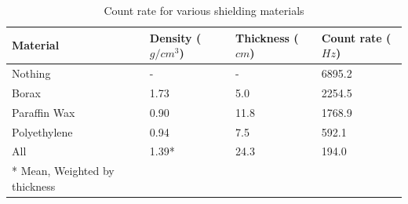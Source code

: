 \begin{table}[ht]
	\centering
	\begin{tabular}{ llll }
		Material 	& Density ($g/cm^3$)	& Thickness ($cm$) & Count rate ($Hz$)\\ \hline\hline
		Nothing  	& - 			& - 		 & 6895.2	\\
		Borax	 	& 1.73 			& 5.0		 & 2254.5   	\\
		Paraffin Wax 	& 0.90 			& 11.8		 & 1768.9   	\\
		Polyethylene 	& 0.94 			& 7.5		 & 592.1	\\
		All	 	& 1.39*			& 24.3 		 & 194.0	\\ \hline
		* Mean, Weighted by thickness
	\end{tabular}
	\caption{Count rate for various shielding materials}
	\label{tab:matTest}
\end{table}	



